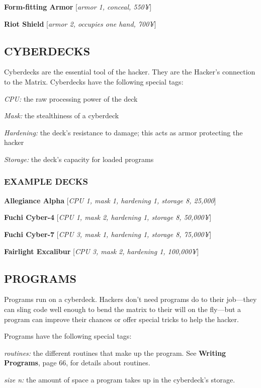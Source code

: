 \documentclass[oneside,10pt]{article}
\begin{document}
\begin{multicols}{2}
\textbf{Form-fitting Armor} [\textit{armor 1,
  conceal, 550¥}]

\textbf{Riot Shield} [\textit{armor 2, occupies
  one hand, 700¥}]


\subsection{CYBERDECKS}
Cyberdecks are the essential tool of the hacker. They are the
Hacker’s connection to the Matrix. Cyberdecks have
the following special tags:

\begin{adjustwidth*}{.5cm}{.5cm}
\textit{CPU:} the raw processing power of the deck

\textit{Mask:} the stealthiness of a cyberdeck

\textit{Hardening:} the deck’s resistance to damage; this
acts as armor protecting the hacker

\textit{Storage:} the deck’s capacity for loaded programs
\end{adjustwidth*}

\subsubsection{EXAMPLE DECKS}
\textbf{Allegiance Alpha} [\textit{CPU 1, mask 1, hardening 1, storage 8,
25,000}]

\textbf{Fuchi Cyber-4} [\textit{CPU 1, mask 2, hardening 1, storage 8,
50,000¥}]

\textbf{Fuchi Cyber-7} [\textit{CPU 3, mask 1, hardening 1, storage 8,
75,000¥}]

\textbf{Fairlight Excalibur} [\textit{CPU 3, mask
  2, hardening 1, 100,000¥}]


\subsection{PROGRAMS}
Programs run on a cyberdeck. Hackers don’t need programs
do to their job—they can sling code well enough to bend the
matrix to their will on the fly—but a program can improve
their chances or offer special tricks to help the
hacker.

Programs have the following special tags:
\begin{adjustwidth*}{.5cm}{.5cm}

\textit{routines:} the different routines that make up the program.
See \textbf{Writing Programs}, page 66, for details about routines.

\textit{size n:} the amount of space a program takes up in the cyberdeck’s storage.
\end{adjustwidth*}


\end{multicols}
\end{document}
